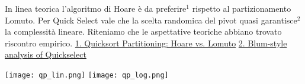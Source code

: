 \documentclass{article}
\begin{document}
\newline
\newline
In linea teorica l'algoritmo di Hoare è da preferire$^1$ rispetto al partizionamento Lomuto.
\newline
Per Quick Select vale che la scelta randomica del pivot quasi garantisce$^2$ la complessità lineare.
\newline
Riteniamo che le aspettative teoriche abbiano trovato riscontro empirico.
\newline
\newline
\newline
\newline
\newline
\newline
\href{https://cs.stackexchange.com/a/11550}{1. Quicksort Partitioning: Hoare vs. Lomuto}
\newline
\href{https://11011110.github.io/blog/2007/10/09/blum-style-analysis-of.html}{2. Blum-style analysis of Quickselect}

\newpage
\begin{center}
\texttt{[image: qp\_lin.png]}
\texttt{[image: qp\_log.png]}
\end{center}

\newpage
\end{document}
